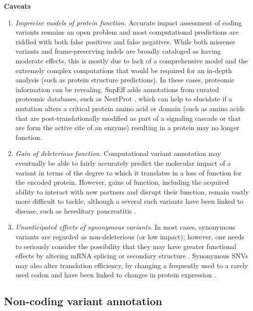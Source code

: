 \textbf{Caveats}
	\begin{enumerate}[label=\roman*]
	
	\item \textit{Imprecise models of protein function.} Accurate impact assessment of coding variants remains an open problem and most computational predictions are riddled with both false positives and false negatives. While both missense variants and frame-preserving indels are broadly cataloged as having moderate effects, this is mostly due to lack of a comprehensive model and the extremely complex computations that would be required for an in-depth analysis (such as protein structure predictions). In these cases, proteomic information can be revealing. SnpEff adds annotations from curated proteomic databases, such as NextProt  \cite{lane2012nextprot}, which can help to elucidate if a mutation alters a critical protein amino acid or domain (such as amino acids that are post-translationally modified as part of a signaling cascade or that are form the active site of an enzyme) resulting in a protein may no longer function.
	
	\item \textit{Gain of deleterious function.} Computational variant annotation may eventually be able to fairly accurately predict the molecular impact of a variant in terms of the degree to which it translates in a loss of function for the encoded protein. However, gains of function, including the acquired ability to interact with new partners and disrupt their function, remain vastly more difficult to tackle, although a several such variants have been linked to disease, such as hereditary pancreatitis  \cite{whitcomb1996hereditary}.
	
	\item \textit{Unanticipated effects of synonymous variants.} In most cases, synonymous variants are regarded as non-deleterious (or low impact); however, one needs to seriously consider the possibility that they may have greater functional effects by altering mRNA splicing  \cite{coulombe2009fine} or secondary structure  \cite{sabarinathan2013rnasnp}. Synonymous SNVs may also alter translation efficiency, by changing a frequently used to a rarely used codon and have been linked to changes in protein expression  \cite{sauna2011understanding}.
	
	\end{enumerate}

\subsection{Non-coding variant annotation}

